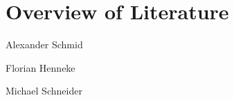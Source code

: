 \documentclass[conference]{IEEEtran}
\begin{document}
\section{Overview of Literature}
Alexander Schmid \cite{Akram2017} \cite{Arm2020} \cite{Asanovic2014} \cite{HeuiLee2001} \cite{Patterson2019} \cite{Perotti2020} \cite{Shore2015} \cite{Waterman2016} \cite{Xu2003}

Florian Henneke \cite{Waterman2016} \cite{Ryzhyk2006} \cite{Asanovic2014} \cite{Furber2000} \cite{Microsoft2020} \cite{Greenwaves2020} \cite{Aws2020} \cite{Microsoft2020}

Michael Schneider \cite{Waterman2017} \cite{Arm2020} \cite{George1990} \cite{Waterman2016} \cite{50years} \cite{hennessy2012computer} \cite{drechsler2020enhanced} \cite{WisconsinMadison2016} \cite{IEEE2018} \cite{Dirvin2019} \cite{Bandic2019} \cite{Berkeley2019}



\end{document}
